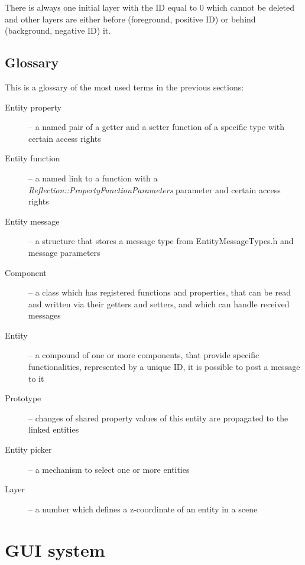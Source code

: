 \documentclass[a4paper, 12pt]{report}
\begin{document}
There is always one initial layer with the ID equal to 0 which cannot be deleted and other layers are either before (foreground, positive ID) or behind (background, negative ID) it.

\section{Glossary}

This is a glossary of the most used terms in the previous sections:

\begin{description}
  \item[Entity property] -- a named pair of a getter and a setter function of a specific type with certain access rights
  \item[Entity function] -- a named link to a function with a \emph{Reflection::Property\-FunctionParameters} parameter and certain access rights
  \item[Entity message] -- a structure that stores a message type from EntityMessageTypes.h and message parameters
  \item[Component] -- a class which has registered functions and properties, that can be read and written via their getters and setters, and which can handle received messages
  \item[Entity] -- a compound of one or more components, that provide specific functionalities, represented by a unique ID, it is possible to post a message to it
  \item[Prototype] -- changes of shared property values of this entity are propagated to the linked entities
  \item[Entity picker] -- a mechanism to select one or more entities
  \item[Layer] -- a number which defines a z-coordinate of an entity in a scene
\end{description}


\chapter{GUI system}
\end{document}

